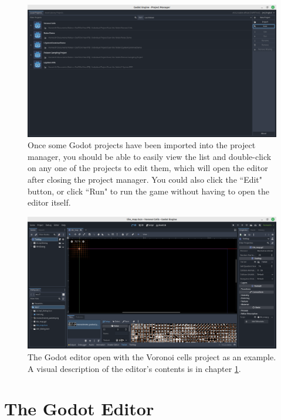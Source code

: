 \begin{figure}[H]
    \centering
    \includegraphics[width=\textwidth]{Images/projects-scanned.png}
    \caption{Once some Godot projects have been imported into the project manager, you should be able to easily view the list and double-click on any one of the projects to edit them, which will open the editor after closing the project manager. You could also click the ``Edit" button, or click ``Run" to run the game without having to open the editor itself.}
    \label{fig:godot3}
\end{figure}

\begin{figure}[H]
    \centering
    \includegraphics[width=\textwidth]{Images/godot-editor.png}
    \caption{The Godot editor open with the Voronoi cells project as an example. A visual description of the editor's contents is in chapter \ref{editor}.}
    \label{fig:godot4}
\end{figure}

\section{The Godot Editor} \label{editor}

